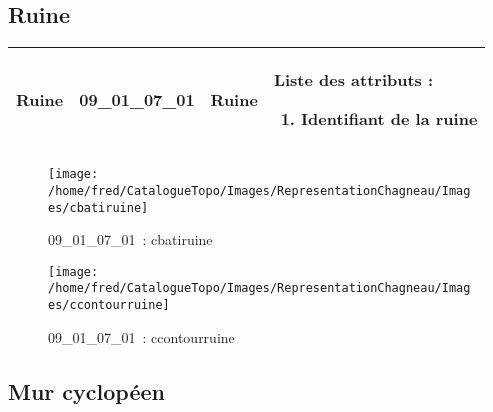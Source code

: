 \documentclass[12pt,titlepage]{book}
\begin{document}
\subsection{Ruine}
\noindent
\vspace{\baselineskip}

\renewcommand{\arraystretch}{1.2}
\begin{supertabular}{|p{10cm}|c|p{13cm}|p{12cm}|}
 Ruine & 09\_01\_07\_01 & Ruine & Liste des attributs :
\begin{enumerate}
  \item Identifiant de la ruine\end{enumerate}
\\
\hline
\end{supertabular}
\begin{figure}[h!]
  \hfill         %
  \begin{minipage}[t]{3cm}
    \begin{center}
      \texttt{[image: /home/fred/CatalogueTopo/Images/RepresentationChagneau/Images/cbatiruine]}
      \caption[~09\_01\_07\_01]{\small{09\_01\_07\_01~:} \tiny{cbatiruine}}\label{cbatiruine}
    \end{center}
  \end{minipage}
  \begin{minipage}[t]{3cm}
    \begin{center}
      \texttt{[image: /home/fred/CatalogueTopo/Images/RepresentationChagneau/Images/ccontourruine]}
      \caption[~09\_01\_07\_01]{\small{09\_01\_07\_01~:} \tiny{ccontourruine}}\label{ccontourruine}
    \end{center}
  \end{minipage}
\end{figure}


\subsection{Mur cyclopéen}
\noindent
\vspace{\baselineskip}
\end{document}
